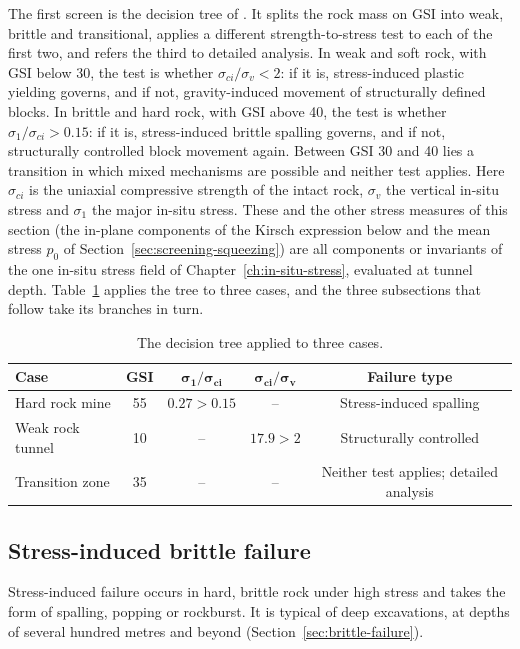 The first screen is the decision tree of \citet{martin2003stress}. It splits the rock mass on GSI into weak, brittle
and transitional, applies a different strength-to-stress test to each of the
first two, and refers the third to detailed analysis. In weak and soft rock,
with GSI below 30, the test is whether \(\sigma_{ci}/\sigma_v < 2\): if it
is, stress-induced plastic yielding governs, and if not, gravity-induced
movement of structurally defined blocks. In brittle and hard rock, with GSI
above 40, the test is whether \(\sigma_1/\sigma_{ci} > 0.15\): if it is,
stress-induced brittle spalling governs, and if not, structurally controlled
block movement again. Between GSI 30 and 40 lies a transition in which mixed
mechanisms are possible and neither test applies. Here \(\sigma_{ci}\) is the
uniaxial compressive strength of the intact rock, \(\sigma_v\) the vertical
in-situ stress and \(\sigma_1\) the major in-situ stress. These and the
other stress measures of this section (the in-plane components of the
Kirsch expression below and the mean stress \(p_0\) of
Section~\ref{sec:screening-squeezing}) are all components or invariants
of the one in-situ stress field of Chapter~\ref{ch:in-situ-stress},
evaluated at tunnel depth.
Table~\ref{tab:decision-tree-cases} applies the tree to three cases, and the
three subsections that follow take its branches in turn.

\begin{table}[htbp]
\caption{The decision tree applied to three cases.}
\label{tab:decision-tree-cases}
\centering
\small
\begin{tabular}{lcccc}
\toprule
\textbf{Case} & \textbf{GSI} & $\boldsymbol{\sigma_1/\sigma_{ci}}$ & $\boldsymbol{\sigma_{ci}/\sigma_v}$ & \textbf{Failure type} \\
\midrule
Hard rock mine & 55 & $0.27 > 0.15$ & -- & Stress-induced spalling \\
Weak rock tunnel & 10 & -- & $17.9 > 2$ & Structurally controlled \\
Transition zone & 35 & -- & -- & Neither test applies; detailed analysis \\
\bottomrule
\end{tabular}
\end{table}

\subsection{Stress-induced brittle failure}
\label{sec:screening-brittle}

Stress-induced failure occurs in hard, brittle rock under high stress and
takes the form of spalling, popping or rockburst. It is typical of deep
excavations, at depths of several hundred metres and beyond
(Section~\ref{sec:brittle-failure}).

